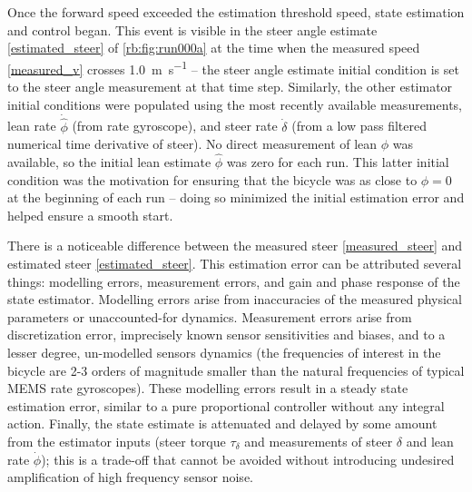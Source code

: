 Once the forward speed exceeded the estimation threshold speed, state
estimation and control began. This event is visible in the steer angle estimate
\ref{estimated_steer} of \autoref{rb:fig:run000a} at the time when the
measured speed \ref{measured_v} crosses \SI{1.0}{\m\per\s} -- the steer angle estimate
initial condition is set to the steer angle measurement at that time step.
Similarly, the other estimator initial conditions were populated using the most
recently available measurements, lean rate $\dot{\hat{\phi}}$ (from rate
gyroscope), and steer rate $\dot{\delta}$ (from a low pass filtered numerical
time derivative of steer). No direct measurement of lean $\phi$ was available,
so the initial lean estimate $\hat{\phi}$ was zero for each run.  This latter
initial condition was the motivation for ensuring that the bicycle was as close
to $\phi=0$ at the beginning of each run -- doing so minimized the initial
estimation error and helped ensure a smooth start.

There is a noticeable difference between the measured steer
\ref{measured_steer} and estimated steer \ref{estimated_steer}. This
estimation error can be attributed several things: modelling errors,
measurement errors, and gain and phase response of the state estimator.
Modelling errors arise from inaccuracies of the measured physical parameters or
unaccounted-for dynamics. Measurement errors arise from discretization error,
imprecisely known sensor sensitivities and biases, and to a lesser degree,
un-modelled sensors dynamics (the frequencies of interest in the bicycle are
2-3 orders of magnitude smaller than the natural frequencies of typical MEMS
rate gyroscopes). These modelling errors result in a steady state estimation
error, similar to a pure proportional controller without any integral action.
Finally, the state estimate is attenuated and delayed by some amount from the
estimator inputs (steer torque $\tau_\delta$ and measurements of steer $\delta$
and lean rate $\dot{\phi}$); this is a trade-off that cannot be avoided without
introducing undesired amplification of high frequency sensor noise.


